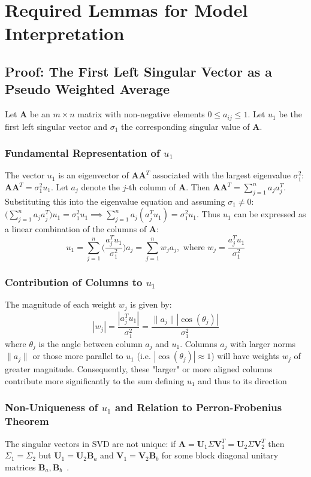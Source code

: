 \chapter{Required Lemmas for Model Interpretation}

\section{Proof: The First Left Singular Vector as a Pseudo Weighted Average}
\label{app:vector-to-avg}
Let $\mathbf{A}$ be an $m \times n$ matrix with non-negative elements $0 \leq
a_{ij} \leq 1$. Let $u_1$ be the first left singular vector and $\sigma_1$ the
corresponding singular value of $\mathbf{A}$.

\subsection{Fundamental Representation of $u_1$}
The vector $u_1$ is an eigenvector of $\mathbf{AA}^T$ associated with the
largest eigenvalue $\sigma_1^2$: $\mathbf{AA}^T = \sigma_1^2 u_1$. Let $a_j$
denote the $j$-th column of $\mathbf{A}$. Then $\mathbf{AA}^T = \sum_{j=1}^n a_j
a_j^T$. Substituting this into the eigenvalue equation and assuming $\sigma_1
\neq 0$: $\big( \sum_{j = 1}^n a_j a_j^T\big) u_1 = \sigma_1^2 u_1 \implies
\sum_{j=1}^n a_j (a_j^T u_1) = \sigma_1^2 u_1$. Thus $u_1$ can be expressed as a
linear combination of the columns of $\mathbf{A}$:
\[ u_1 = \sum_{j=1}^n \bigg(\frac{a_j^T u_1}{\sigma_1^2}\bigg) a_j =
\sum_{j=1}^n w_j a_j, \text{  where } w_j = \frac{a_j^T u_1}{\sigma_1^2} \]

\subsection{Contribution of Columns to $u_1$}
The magnitude of each weight $w_j$ is given by:
\[ |w_j| = \frac{|a_j^T u_1|}{\sigma_1^2} = \frac{\parallel a_j\parallel
|\cos(\theta_j)|}{\sigma_1^2}\]
where $\theta_j$ is the angle between column $a_j$ and $u_1$. Columns $a_j$ with
larger norms $\parallel a_j \parallel$ or those more parallel to $u_1$ (i.e.
$|\cos(\theta_j)| \approx 1$) will have weights $w_j$ of greater magnitude.
Consequently, these "larger" or more aligned columns contribute more
significantly to the sum defining $u_1$ and thus to its direction

\subsection{Non-Uniqueness of $u_1$ and Relation to Perron-Frobenius Theorem}
The singular vectors in SVD are not unique: if $\mathbf{A} =
\mathbf{U}_1\Sigma\mathbf{V}_1^T = \mathbf{U}_2\Sigma\mathbf{V}_2^T$ then
$\Sigma_1 = \Sigma_2$ but $\mathbf{U}_1 = \mathbf{U}_2\mathbf{B}_a$ and
$\mathbf{V}_1 = \mathbf{V}_2\mathbf{B}_b$ for some block diagonal unitary
matrices $\mathbf{B}_a, \mathbf{B}_b$~\cite{eftekhari2019moses}.

